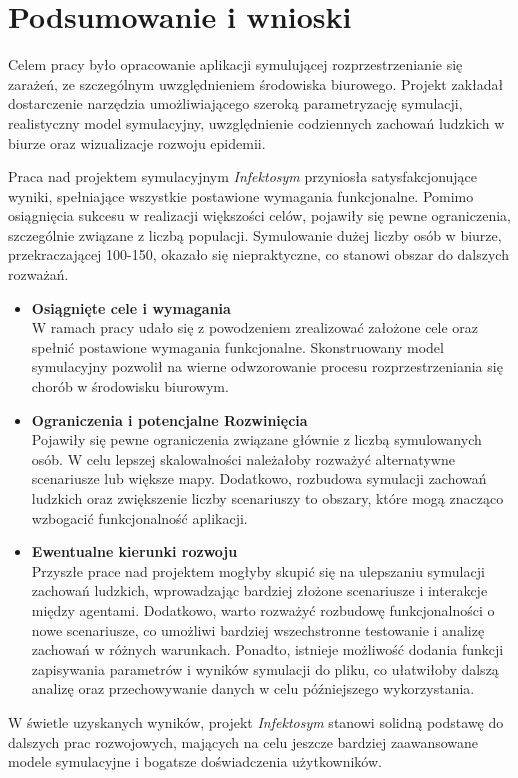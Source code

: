 \chapter*{Podsumowanie i wnioski}
\label{Podsumowanie i wnioski}
Celem pracy było opracowanie aplikacji symulującej rozprzestrzenianie się zarażeń, ze szczególnym uwzględnieniem środowiska biurowego. Projekt zakładał dostarczenie narzędzia umożliwiającego szeroką parametryzację symulacji, realistyczny model symulacyjny, uwzględnienie codziennych zachowań ludzkich w biurze oraz wizualizacje rozwoju epidemii.

Praca nad projektem symulacyjnym \textit{Infektosym} przyniosła satysfakcjonujące wyniki, spełniające wszystkie postawione wymagania funkcjonalne. Pomimo osiągnięcia sukcesu w realizacji większości celów, pojawiły się pewne ograniczenia, szczególnie związane z liczbą populacji. Symulowanie dużej liczby osób w biurze, przekraczającej 100-150, okazało się niepraktyczne, co stanowi obszar do dalszych rozważań.

\begin{itemize}
	\item \textbf{Osiągnięte cele i wymagania} \\
	 W ramach pracy udało się z powodzeniem zrealizować założone cele oraz spełnić postawione wymagania funkcjonalne. Skonstruowany model symulacyjny pozwolił na wierne odwzorowanie procesu rozprzestrzeniania się chorób w środowisku biurowym.
	
	\item \textbf{Ograniczenia i potencjalne Rozwinięcia} \\
	 Pojawiły się pewne ograniczenia związane głównie z liczbą symulowanych osób. W celu lepszej skalowalności należałoby rozważyć alternatywne scenariusze lub większe mapy. Dodatkowo, rozbudowa symulacji zachowań ludzkich oraz zwiększenie liczby scenariuszy to obszary, które mogą znacząco wzbogacić funkcjonalność aplikacji.
	
	\item \textbf{Ewentualne kierunki rozwoju} \\
	 Przyszłe prace nad projektem mogłyby skupić się na ulepszaniu symulacji zachowań ludzkich, wprowadzając bardziej złożone scenariusze i interakcje między agentami. Dodatkowo, warto rozważyć rozbudowę funkcjonalności o nowe scenariusze, co umożliwi bardziej wszechstronne testowanie i analizę zachowań w różnych warunkach. Ponadto, istnieje możliwość dodania funkcji zapisywania parametrów i wyników symulacji do pliku, co ułatwiłoby dalszą analizę oraz przechowywanie danych w celu późniejszego wykorzystania.
\end{itemize}

W świetle uzyskanych wyników, projekt \textit{Infektosym} stanowi solidną podstawę do dalszych prac rozwojowych, mających na celu jeszcze bardziej zaawansowane modele symulacyjne i bogatsze doświadczenia użytkowników. 
